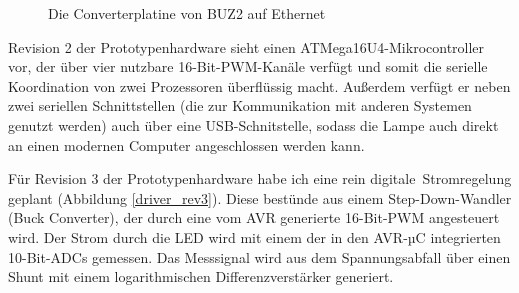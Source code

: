 \documentclass[12pt,a4paper,notitlepage]{article}
\begin{document}
\begin{figure}
\centering
{}
\caption{Die Converterplatine von BUZ2 auf Ethernet}
\label{buz2_converter_ethernet}
\end{figure}

Revision 2 der Prototypenhardware sieht einen ATMega16U4-Mikrocontroller vor, der über vier nutzbare 16-Bit-PWM-Kanäle verfügt und somit die serielle Koordination von zwei Prozessoren überflüssig macht. Außerdem verfügt er neben zwei seriellen Schnittstellen (die zur Kommunikation mit anderen Systemen genutzt werden) auch über eine USB-Schnitstelle, sodass die Lampe auch direkt an einen modernen Computer angeschlossen werden kann.

Für Revision 3 der Prototypenhardware habe ich eine rein \glqq digitale\grqq\ Stromregelung geplant (Abbildung \ref{driver_rev3}). Diese bestünde aus einem Step-Down-Wandler (Buck Converter)\cite{MAXIM24,MAXIM70,NATIONAL4,SPRUT1,MAXIM49},%
der durch eine vom AVR generierte 16-Bit-PWM angesteuert wird. Der Strom durch die LED wird mit einem der in den AVR-µC integrierten 10-Bit-ADCs gemessen. Das Messsignal wird aus dem Spannungsabfall über einen Shunt %
mit einem logarithmischen Differenzverstärker generiert\cite{MAXIM34}.
\end{document}
